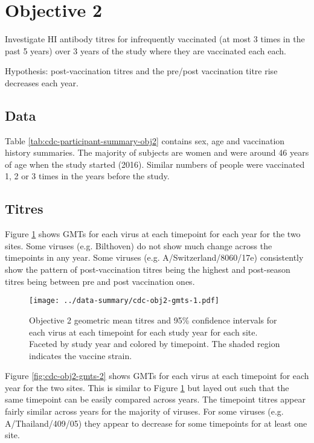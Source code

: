 \documentclass[12pt]{article}
\begin{document}


\section{Objective 2}

Investigate HI antibody titres for infrequently vaccinated (at most 3 times in the past 5 years) over 3 years of the study where
they are vaccinated each each.

Hypothesis: post-vaccination titres and the pre/post vaccination titre rise
decreases each year.

\subsection{Data}

Table \ref{tab:cdc-participant-summary-obj2} contains sex, age and
vaccination history summaries.
The majority of subjects are
women and were around 46 years of age when the study started (2016).
Similar numbers of people were vaccinated 1, 2 or 3 times in the years before
the study.



\subsection{Titres}

Figure \ref{fig:cdc-obj2-gmts-1} shows GMTs for each virus at each timepoint for each year for the two sites.
Some viruses (e.g. Bilthoven) do not show much change across the timepoints in
any year. Some viruses (e.g. A/Switzerland/8060/17e) consistently show the pattern of post-vaccination titres being the highest and post-season titres being between pre and post vaccination ones.

\begin{figure}
	\texttt{[image: ../data-summary/cdc-obj2-gmts-1.pdf]}
	\caption{Objective 2 geometric mean titres and 95\% confidence intervals for each virus at each timepoint for each study year for each site. Faceted by study year and colored by timepoint. The shaded region indicates the vaccine strain.}
	\label{fig:cdc-obj2-gmts-1}
\end{figure}

Figure \ref{fig:cdc-obj2-gmts-2} shows GMTs for each virus at each timepoint for each year for the two sites. This is similar to Figure \ref{fig:cdc-obj2-gmts-1} but layed out such that the same timepoint can be easily compared across years. The timepoint titres appear fairly similar across years for the majority of viruses. For some viruses (e.g. A/Thailand/409/05) they appear to decrease for some timepoints for at least one site.
\end{document}

